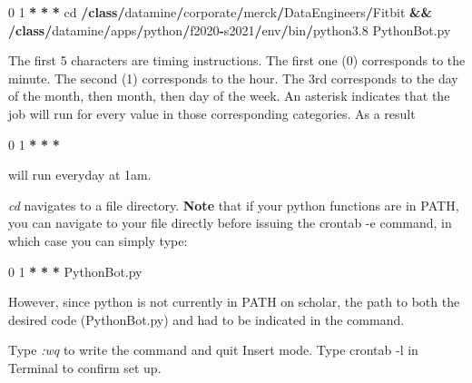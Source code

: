 \documentclass[]{book}
\newenvironment{Shaded}{\begin{snugshade}}{\end{snugshade}}
\newcommand{\KeywordTok}[1]{\textcolor[rgb]{0.13,0.29,0.53}{\textbf{#1}}}
\newcommand{\DecValTok}[1]{\textcolor[rgb]{0.00,0.00,0.81}{#1}}
\newcommand{\FloatTok}[1]{\textcolor[rgb]{0.00,0.00,0.81}{#1}}
\newcommand{\OperatorTok}[1]{\textcolor[rgb]{0.81,0.36,0.00}{\textbf{#1}}}
\newcommand{\BuiltInTok}[1]{#1}
\newcommand{\NormalTok}[1]{#1}
\begin{document}
\begin{Shaded}
\begin{Highlighting}[]
\DecValTok{0} \DecValTok{1} \OperatorTok{*} \OperatorTok{*} \OperatorTok{*}\NormalTok{ cd }\OperatorTok{/}\KeywordTok{class}\OperatorTok{/}\NormalTok{datamine}\OperatorTok{/}\NormalTok{corporate}\OperatorTok{/}\NormalTok{merck}\OperatorTok{/}\NormalTok{DataEngineers}\OperatorTok{/}\NormalTok{Fitbit }\OperatorTok{&&} \OperatorTok{/}\KeywordTok{class}\OperatorTok{/}\NormalTok{datamine}\OperatorTok{/}\NormalTok{apps}\OperatorTok{/}\NormalTok{python}\OperatorTok{/}\NormalTok{f2020}\OperatorTok{-}\NormalTok{s2021}\OperatorTok{/}\NormalTok{env}\OperatorTok{/}\BuiltInTok{bin}\OperatorTok{/}\NormalTok{python3}\FloatTok{.8}\NormalTok{ PythonBot.py}
\end{Highlighting}
\end{Shaded}

The first 5 characters are timing instructions. The first one (0)
corresponds to the minute. The second (1) corresponds to the hour. The
3rd corresponds to the day of the month, then month, then day of the
week. An asterisk indicates that the job will run for every value in
those corresponding categories. As a result

\begin{Shaded}
\begin{Highlighting}[]
\DecValTok{0} \DecValTok{1} \OperatorTok{*} \OperatorTok{*} \OperatorTok{*} 
\end{Highlighting}
\end{Shaded}

will run everyday at 1am.

\emph{cd} navigates to a file directory. \textbf{Note} that if your
python functions are in PATH, you can navigate to your file directly
before issuing the crontab -e command, in which case you can simply
type:

\begin{Shaded}
\begin{Highlighting}[]
\DecValTok{0} \DecValTok{1} \OperatorTok{*} \OperatorTok{*} \OperatorTok{*}\NormalTok{ PythonBot.py}
\end{Highlighting}
\end{Shaded}

However, since python is not currently in PATH on scholar, the path to
both the desired code (PythonBot.py) and had to be indicated in the
command.

Type \emph{:wq} to write the command and quit Insert mode. Type crontab
-l in Terminal to confirm set up.
\end{document}
